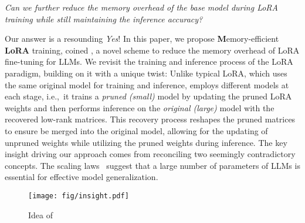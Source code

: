 \textit{
Can we further reduce the memory overhead of the base model during LoRA training while still maintaining the inference accuracy?
}

Our answer is a resounding \textit{Yes}!
In this paper, we propose \textbf{M}emory-efficient \textbf{LoRA} training, coined \method, 
a novel scheme to reduce the memory overhead of LoRA fine-tuning for LLMs.
We revisit the training and inference process of the LoRA paradigm, building on it with a unique twist:
Unlike typical LoRA, which uses the same original model for training and inference, \method employs different models at each stage, i.e.,~it trains a \textit{pruned (small)} model by updating the pruned LoRA weights and then performs inference on the \textit{original (large)} model with the 
recovered low-rank matrices.
This recovery process reshapes the pruned matrices to ensure be merged into the original model, allowing for the updating of unpruned weights while utilizing the pruned weights during inference.
The key insight driving our approach comes from reconciling two seemingly contradictory concepts.
The scaling laws~\citep{2022scalinglaw1,2020scalinglaw2,2021scalinglaw3} suggest that a large number of parameters of LLMs is essential for effective model generalization.
\begin{wrapfigure}[15]{r} 
{0.30\textwidth}
    \vspace{-15pt} %
    \begin{center}
\texttt{[image: fig/insight.pdf]}
\vspace{-20pt}
        \caption{Idea of \method}
        \label{fig:idea}
    \end{center}
    \vspace{-10pt} %
    
\end{wrapfigure}
